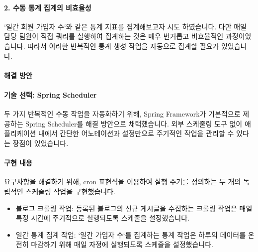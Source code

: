 \documentclass[12pt,a4paper]{article}
\begin{document}
    \vspace{1em}


    \paragraph{2. 수동 통계 집계의 비효율성} \par
    `일간 회원 가입자 수`와 같은 통계 지표를 집계해보고자 시도 하였습니다. 다만 매일 담당 팀원이 직접 쿼리를 실행하여 집계하는 것은 매우 번거롭고 비효율적인 과정이었습니다. 따라서 이러한 반복적인 통계 생성 작업을 자동으로 집계할 필요가 있었습니다.\\




    \paragraph{해결 방안}



    \paragraph{기술 선택: Spring Scheduler} \par
    두 가지 반복적인 수동 작업을 자동화하기 위해, Spring Framework가 기본적으로 제공하는 Spring Scheduler를 해결 방안으로 채택했습니다. 외부 스케줄링 도구 없이 애플리케이션 내에서 간단한 어노테이션과 설정만으로 주기적인 작업을 관리할 수 있다는 장점이 있었습니다.\\

    \vspace{1em}


    \paragraph{구현 내용} \par
    요구사항을 해결하기 위해, cron 표현식을 이용하여 실행 주기를 정의하는 두 개의 독립적인 스케줄링 작업을 구현했습니다.\\


    \begin{itemize}
        \item 블로그 크롤링 작업: 등록된 블로그의 신규 게시글을 수집하는 크롤링 작업은 매일 특정 시간에 주기적으로 실행되도록 스케줄을 설정했습니다.
        \item 일간 통계 집계 작업: `일간 가입자 수`를 집계하는 통계 작업은 하루의 데이터를 온전히 마감하기 위해 매일 자정에 실행되도록 스케줄을 설정했습니다.
    \end{itemize}
\end{document}
